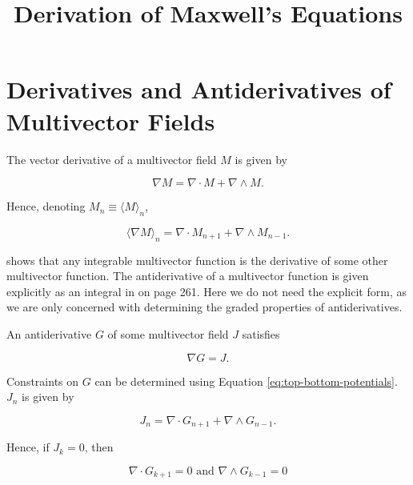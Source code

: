 \documentclass{article}
\title{Derivation of Maxwell's Equations}
\begin{document}
\maketitle
{}

\section{Derivatives and Antiderivatives of Multivector Fields}

The vector derivative of a multivector field $M$ is given by

\begin{equation}
  \nabla M = \nabla \cdot M + \nabla \wedge M.
\end{equation}

Hence, denoting $M_n \equiv \langle M \rangle_n$,

\begin{equation}
  \langle \nabla M \rangle_n = \nabla \cdot M_{n+1} + \nabla \wedge M_{n-1}.\label{eq:top-bottom-potentials}
\end{equation}

\cite{cagc} shows that any integrable multivector function is the derivative of some other multivector function. The antiderivative of a multivector function is given explicitly as an integral in \cite{cagc} on page 261. Here we do not need the explicit form, as we are only concerned with determining the graded properties of antiderivatives.

An antiderivative $G$ of some multivector field $J$ satisfies

\begin{equation}
  \nabla G = J.
\end{equation}

Constraints on $G$ can be determined using Equation \ref{eq:top-bottom-potentials}. $J_n$ is given by

\begin{equation}
  J_n = \nabla \cdot G_{n+1} + \nabla \wedge G_{n-1}.\label{eq:potential-grade}
\end{equation}

Hence, if $J_k = 0$, then

\begin{equation}
  \nabla \cdot G_{k+1} = 0 \text{ and } \nabla \wedge G_{k-1} = 0\label{eq:constraints}
\end{equation}
\end{document}
